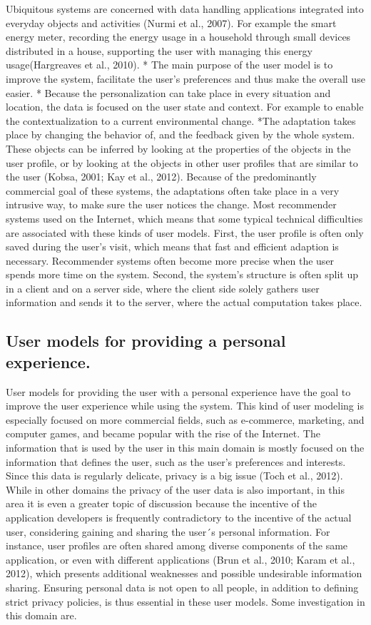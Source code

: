 Ubiquitous systems are concerned with data handling applications integrated into
everyday objects and activities (Nurmi et al., 2007).  For example the smart
energy meter, recording the energy usage in a household through small devices
distributed in a house, supporting the user with managing this energy
usage(Hargreaves et al., 2010).   
*  The main purpose of the user model is to
improve the system, facilitate the user’s preferences and thus make the overall
use easier.   
* Because the personalization can take place in every situation
and location, the data is focused on the user state and context. For example to
enable the contextualization to a current environmental change. 
*The adaptation
takes place by changing the behavior of, and the feedback given by the whole
system. These objects can be inferred by looking at the properties of the
objects in the user profile, or by looking at the objects in other user profiles
that are similar to the user (Kobsa, 2001; Kay et al., 2012). Because of the
predominantly commercial goal of these systems, the adaptations often take place
in a very intrusive way, to make sure the user notices the change.
Most recommender systems used on the Internet, which means that some typical
technical difficulties are associated with these kinds of user models. First,
the user profile is often only saved during the user’s visit,  which means that
fast and efficient adaption is necessary. Recommender systems often become more
precise when the user spends more time on the system. Second, the system’s
structure is often split up in a client and on a server side, where the client
side solely gathers user information and sends it to the server, where the
actual computation takes place.

\subsection{User models for providing a personal experience.}

User models for providing the user with a personal experience have the goal to
improve the user experience while using the system.  This kind of user modeling
is especially focused on more commercial fields, such as e-commerce, marketing,
and computer games, and became popular with the rise of the Internet.  The
information that is used by the user in this main domain is mostly focused on
the information that defines the user, such as the user’s preferences and
interests. Since this data is regularly delicate, privacy is a  big issue (Toch
et al., 2012). While in other domains the privacy of the user data is also
important, in this area it is even a greater topic of discussion because the
incentive of the application developers is frequently contradictory to the
incentive of the actual user, considering gaining and sharing the user´s
personal information. For instance, user profiles are often shared among diverse
components of the same application, or even with different applications (Brun et
al., 2010; Karam et al., 2012), which presents additional weaknesses and
possible undesirable information sharing.  Ensuring personal data is not open to
all people, in addition to defining strict privacy policies, is thus essential
in these user models. Some investigation in this domain are.

